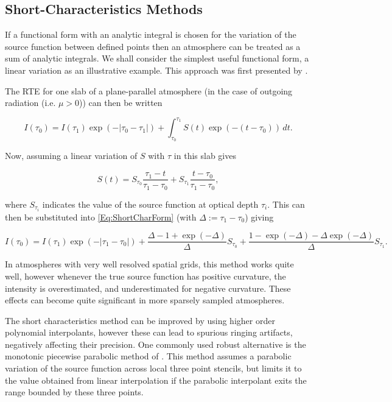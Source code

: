 \subsection{Short-Characteristics Methods}\label{Sec:ShortChar}

If a functional form with an analytic integral is chosen for the variation of the source function between defined points then an atmosphere can be treated as a sum of analytic integrals. We shall consider the simplest useful functional form, a linear variation as an illustrative example.
This approach was first presented by \citet{Olson1987}.

The RTE for one slab of a plane-parallel atmosphere (in the case of outgoing radiation (i.e. $\mu > 0$)) can then be written

\begin{equation}
    I(\tau_0) = I(\tau_1) \exp(- |\tau_0 - \tau_1|) + \int_{\tau_0}^{\tau_1} S(t) \exp(-(t - \tau_0))\, dt.
    \label{Eq:ShortCharForm}
\end{equation}

Now, assuming a linear variation of $S$ with $\tau$ in this slab gives

\begin{equation}
    S(t) = S_{\tau_0} \frac{\tau_1-t}{\tau_1-\tau_0} + S_{\tau_1} \frac{t-\tau_0}{\tau_1-\tau_0},
\end{equation}

where $S_{\tau_i}$ indicates the value of the source function at optical depth $\tau_i$.
This can then be substituted into \eqref{Eq:ShortCharForm} (with $\Delta := \tau_1 - \tau_0$) giving

\begin{equation}
    I(\tau_0) = I(\tau_1) \exp(- |\tau_1 - \tau_0|) +
    \frac{\Delta - 1 + \exp(-\Delta)}{\Delta} S_{\tau_0} +
    \frac{1 - \exp(-\Delta) - \Delta\exp(-\Delta)}{\Delta} S_{\tau_1}.
\end{equation}

In atmospheres with very well resolved spatial grids, this method works quite well, however whenever the true source function has positive curvature, the intensity is overestimated, and underestimated for negative curvature. These effects can become quite significant in more sparsely sampled atmospheres.

The short characteristics method can be improved by using higher order polynomial interpolants, however these can lead to spurious ringing artifacts, negatively affecting their precision. One commonly used robust alternative is the monotonic piecewise parabolic method of \citet{Auer1994}. This method assumes a parabolic variation of the source function across local three point stencils, but limits it to the value obtained from linear interpolation if the parabolic interpolant exits the range bounded by these three points.

